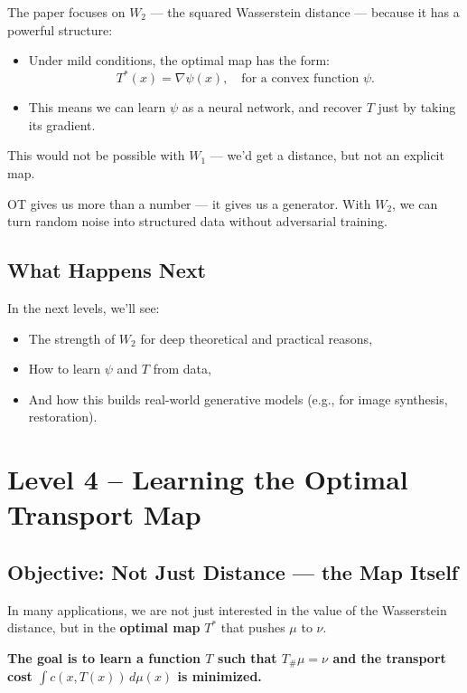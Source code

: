 \documentclass[11pt]{article}
\begin{document}
The paper focuses on $W_2$ — the squared Wasserstein distance — because it has a powerful structure:

\begin{itemize}
  \item Under mild conditions, the optimal map has the form:
  \[
  T^*(x) = \nabla \psi(x), \quad \text{for a convex function } \psi.
  \]
  \item This means we can learn $\psi$ as a neural network, and recover $T$ just by taking its gradient.
\end{itemize}

This would not be possible with $W_1$ — we’d get a distance, but not an explicit map.

\begin{tcolorbox}[colback=blue!4!white, colframe=blue!80!black, title=Bottom Line]
OT gives us more than a number — it gives us a generator.
With $W_2$, we can turn random noise into structured data without adversarial training.
\end{tcolorbox}

\subsection*{What Happens Next}
In the next levels, we’ll see:
\begin{itemize}
  \item The strength of $W_2$ for deep theoretical and practical reasons,
  \item How to learn $\psi$ and $T$ from data,
  \item And how this builds real-world generative models (e.g., for image synthesis, restoration).
\end{itemize}

\newpage
{}
\section*{Level 4 – Learning the Optimal Transport Map}

\subsection*{Objective: Not Just Distance — the Map Itself}
In many applications, we are not just interested in the value of the Wasserstein distance, but in the \textbf{optimal map} $T^*$ that pushes $\mu$ to $\nu$.

\begin{highlight}
\textbf{The goal is to learn a function $T$ such that $T_\#\mu = \nu$ and the transport cost $\int c(x, T(x)) \, d\mu(x)$ is minimized.}
\end{highlight}
\end{document}
